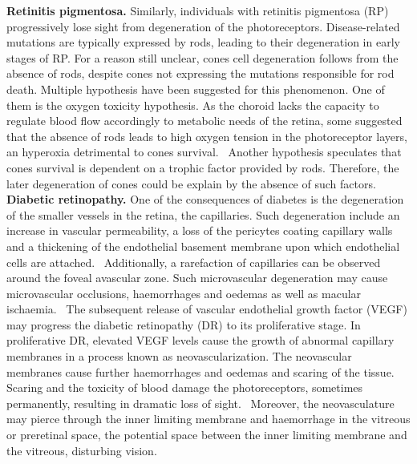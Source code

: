 \documentclass[12pt,a4paper]{journal}
\begin{document}
\textbf{Retinitis pigmentosa.}
Similarly, individuals with retinitis pigmentosa (RP) progressively lose sight from degeneration of the photoreceptors.
Disease-related mutations are typically expressed by rods, leading to their degeneration in early stages of RP.
For a reason still unclear, cones cell degeneration follows from the absence of rods, despite cones not expressing the mutations responsible for rod death.
Multiple hypothesis have been suggested for this phenomenon.
One of them is the oxygen toxicity hypothesis.
As the choroid lacks the capacity to regulate blood flow accordingly to metabolic needs of the retina, some suggested that the absence of rods leads to high oxygen tension in the photoreceptor layers, an hyperoxia detrimental to cones survival.~\cite{Roberts_2018,Stone_1999}
Another hypothesis speculates that cones survival is dependent on a trophic factor provided by rods.
Therefore, the later degeneration of cones could be explain by the absence of such factors.~\cite{Roberts_2022}\\

\textbf{Diabetic retinopathy.}
One of the consequences of diabetes is the degeneration of the smaller vessels in the retina, the capillaries.
Such degeneration include an increase in vascular permeability, a loss of the pericytes coating capillary walls and a thickening of the endothelial basement membrane upon which endothelial cells are attached.~\cite{Medina_2016}
Additionally, a rarefaction of capillaries can be observed around the foveal avascular zone.
Such microvascular degeneration may cause microvascular occlusions, haemorrhages and oedemas as well as macular ischaemia.~\cite{Medina_2016}
The subsequent release of vascular endothelial growth factor (VEGF) may progress the diabetic retinopathy (DR) to its proliferative stage.
In proliferative DR, elevated VEGF levels cause the growth of abnormal capillary membranes in a process known as neovascularization.
The neovascular membranes cause further haemorrhages and oedemas and scaring of the tissue.
Scaring and the toxicity of blood damage the photoreceptors, sometimes permanently, resulting in dramatic loss of sight.~\cite{Friedlander_2007,Gupta_2015}
Moreover, the neovasculature may pierce through the inner limiting membrane and haemorrhage in the vitreous or preretinal space, the potential space between the inner limiting membrane and the vitreous, disturbing vision.\\
\end{document}
